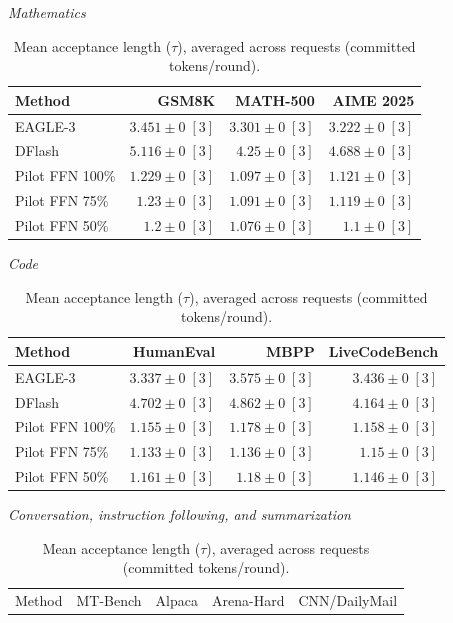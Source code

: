 \begin{table}[!htp]
\centering\small
\setlength{\tabcolsep}{3pt}
\caption{Mean acceptance length (\(\tau\)), averaged across requests (committed tokens/round).}
\label{tab:appendix-metric-acceptance-length-request-none}
\textit{Mathematics}\par\smallskip
\begin{tabular}{@{}>{\raggedright\arraybackslash}p{3.7cm}rrr@{}}
\toprule
Method & GSM8K & MATH-500 & AIME 2025 \\
\midrule
EAGLE-3 & \(3.451 \pm 0\;[3]\) & \(3.301 \pm 0\;[3]\) & \(3.222 \pm 0\;[3]\) \\
DFlash & \(\mathbf{5.116} \pm 0\;[3]\) & \(\mathbf{4.25} \pm 0\;[3]\) & \(\mathbf{4.688} \pm 0\;[3]\) \\
Pilot FFN 100\% & \(1.229 \pm 0\;[3]\) & \(1.097 \pm 0\;[3]\) & \(1.121 \pm 0\;[3]\) \\
Pilot FFN 75\% & \(1.23 \pm 0\;[3]\) & \(1.091 \pm 0\;[3]\) & \(1.119 \pm 0\;[3]\) \\
Pilot FFN 50\% & \(1.2 \pm 0\;[3]\) & \(1.076 \pm 0\;[3]\) & \(1.1 \pm 0\;[3]\) \\
\bottomrule
\end{tabular}\par\medskip
\textit{Code}\par\smallskip
\begin{tabular}{@{}>{\raggedright\arraybackslash}p{3.7cm}rrr@{}}
\toprule
Method & HumanEval & MBPP & LiveCodeBench \\
\midrule
EAGLE-3 & \(3.337 \pm 0\;[3]\) & \(3.575 \pm 0\;[3]\) & \(3.436 \pm 0\;[3]\) \\
DFlash & \(\mathbf{4.702} \pm 0\;[3]\) & \(\mathbf{4.862} \pm 0\;[3]\) & \(\mathbf{4.164} \pm 0\;[3]\) \\
Pilot FFN 100\% & \(1.155 \pm 0\;[3]\) & \(1.178 \pm 0\;[3]\) & \(1.158 \pm 0\;[3]\) \\
Pilot FFN 75\% & \(1.133 \pm 0\;[3]\) & \(1.136 \pm 0\;[3]\) & \(1.15 \pm 0\;[3]\) \\
Pilot FFN 50\% & \(1.161 \pm 0\;[3]\) & \(1.18 \pm 0\;[3]\) & \(1.146 \pm 0\;[3]\) \\
\bottomrule
\end{tabular}\par\medskip
\textit{Conversation, instruction following, and summarization}\par\smallskip
\begin{tabular}{@{}>{\raggedright\arraybackslash}p{3.7cm}rrrr@{}}
\toprule
Method & MT-Bench & Alpaca & Arena-Hard & CNN/DailyMail \\

\end{tabular}
\end{table}
